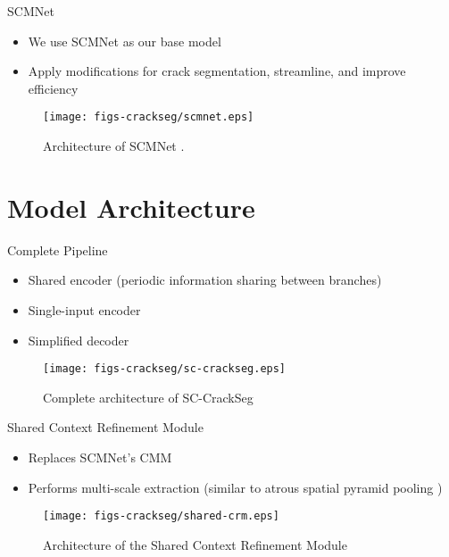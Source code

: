 \documentclass{lib/curtin_format}
\begin{document}
\begin{frame}{SCMNet}
\vspace{0.1cm}
    \begin{itemize}
        \item We use SCMNet \cite{singha2021scmnet} as our base model
        \item Apply modifications for crack segmentation, streamline, and improve efficiency
    \end{itemize}
    \begin{figure}
        \centering
        \texttt{[image: figs-crackseg/scmnet.eps]}
        \caption{Architecture of SCMNet \cite{singha2021scmnet}.}
        \label{fig:farme2}
    \end{figure}
\end{frame}
\section{Model Architecture}

\begin{frame}{Complete Pipeline}
\begin{itemize}
        \item Shared encoder (periodic information sharing between branches)
        \item Single-input encoder
        \item Simplified decoder
    \end{itemize}
   \begin{figure}
        \centering        
        \texttt{[image: figs-crackseg/sc-crackseg.eps]}
        \caption{Complete architecture of SC-CrackSeg}        
        \label{fig:pipeline}
    \end{figure}
\end{frame}

\begin{frame}{Shared Context Refinement Module}
\begin{itemize}
        \item Replaces SCMNet's CMM
        \item Performs multi-scale extraction (similar to atrous spatial pyramid pooling \cite{chen2017deeplab})
    \end{itemize}
   \begin{figure}
        \centering        
        \texttt{[image: figs-crackseg/shared-crm.eps]}
        \caption{Architecture of the Shared Context Refinement Module}        
        \label{fig:pipeline}
    \end{figure}
\end{frame}
\end{document}
